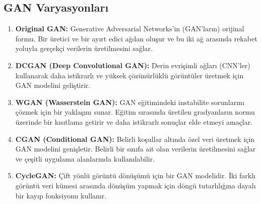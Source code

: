 \documentclass[12pt]{article}
\begin{document}
\subsection{GAN Varyasyonları}
\begin{enumerate}[label=\textbf{\arabic*.}, leftmargin=*]
    \item \textbf{Original GAN:} Generative Adversarial Networks'in (GAN'ların) orijinal formu. Bir üretici ve bir ayırt edici ağdan oluşur ve bu iki ağ arasında rekabet yoluyla gerçekçi verilerin üretilmesini sağlar.
    
    \item \textbf{DCGAN (Deep Convolutional GAN):} Derin evrişimli ağları (CNN'ler) kullanarak daha istikrarlı ve yüksek çözünürlüklü görüntüler üretmek için GAN modelini geliştirir.
    
    \item \textbf{WGAN (Wasserstein GAN):} GAN eğitimindeki instabilite sorunlarını çözmek için bir yaklaşım sunar. Eğitim sırasında üretilen gradyanların normu üzerinde bir kısıtlama getirir ve daha istikrarlı sonuçlar elde etmeyi amaçlar.
    
    \item \textbf{CGAN (Conditional GAN):} Belirli koşullar altında özel veri üretmek için GAN modelini genişletir. Belirli bir sınıfa ait olan verilerin üretilmesini sağlar ve çeşitli uygulama alanlarında kullanılabilir.
    
    \item \textbf{CycleGAN:} Çift yönlü görüntü dönüşümü için bir GAN modelidir. İki farklı görüntü veri kümesi arasında dönüşüm yapmak için döngü tutarlılığına dayalı bir kayıp fonksiyonu kullanır.
\end{enumerate}
\end{document}
